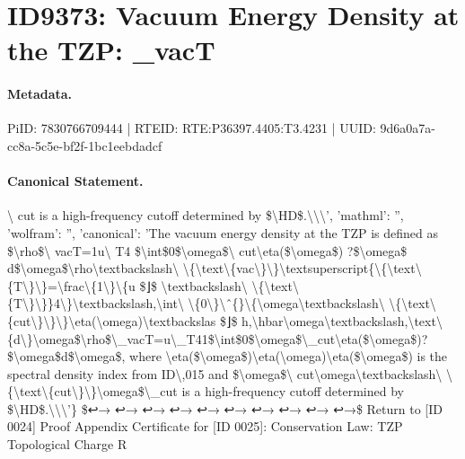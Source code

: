 \section*{ID9373: Vacuum Energy Density at the TZP: \_vacT}
\paragraph{Metadata.}
PiID: 7830766709444 | RTEID: RTE:P36397.4405:T3.4231 | UUID: 9d6a0a7a-cc8a-5c5e-bf2f-1bc1eebdadcf

\paragraph{Canonical Statement.}
\textbackslash{} cut is a high-frequency cutoff determined by \$\textbackslash{}HD\$.\textbackslash{}\textbackslash{}\textbackslash{}', 'mathml': '', 'wolfram': '', 'canonical': 'The vacuum energy density at the TZP is defined as \$\textbackslash{}rho\$\textbackslash{} vacT=1u\textbackslash{} T4 \$\textbackslash{}int\$0\$\textbackslash{}omega\$\textbackslash{} cut\textbackslash{}eta(\$\textbackslash{}omega\$) ?\$\textbackslash{}omega\$ d\$\textbackslash{}omega\$\textbackslash{}rho\textbackslash{}textbackslash\textbackslash{} \textbackslash{}\{\textbackslash{}text\textbackslash{}\{vac\textbackslash{}\}\textbackslash{}\}\textbackslash{}textsuperscript\{\textbackslash{}\{\textbackslash{}text\textbackslash{}\{T\textbackslash{}\}\textbackslash{}\}=\textbackslash{}frac\textbackslash{}\{1\textbackslash{}\}\textbackslash{}\{u \$⌋\$ \textbackslash{}textbackslash\textbackslash{} \textbackslash{}\{\textbackslash{}text\textbackslash{}\{T\textbackslash{}\}\textbackslash{}\}\}4\textbackslash{}\}\textbackslash{}textbackslash,\textbackslash{}int\textbackslash{} \textbackslash{}\{0\textbackslash{}\}\textbackslash{}ˆ\{\}\textbackslash{}\{\textbackslash{}omega\textbackslash{}textbackslash\textbackslash{} \textbackslash{}\{\textbackslash{}text\textbackslash{}\{cut\textbackslash{}\}\textbackslash{}\}\textbackslash{}\}\textbackslash{}eta(\textbackslash{}omega)\textbackslash{}textbackslas \$⌋\$ h,\textbackslash{}hbar\textbackslash{}omega\textbackslash{}textbackslash,\textbackslash{}text\textbackslash{}\{d\textbackslash{}\}\textbackslash{}omega\$\textbackslash{}rho\$\textbackslash{}\_vacT=u\textbackslash{}\_T41\$\textbackslash{}int\$0\$\textbackslash{}omega\$\textbackslash{}\_cut\textbackslash{}eta(\$\textbackslash{}omega\$)?\$\textbackslash{}omega\$d\$\textbackslash{}omega\$, where \textbackslash{}eta(\$\textbackslash{}omega\$)\textbackslash{}eta(\textbackslash{}omega)\textbackslash{}eta(\$\textbackslash{}omega\$) is the spectral density index from ID\textbackslash{},015 and \$\textbackslash{}omega\$\textbackslash{} cut\textbackslash{}omega\textbackslash{}textbackslash\textbackslash{} \textbackslash{}\{\textbackslash{}text\textbackslash{}\{cut\textbackslash{}\}\textbackslash{}\}\textbackslash{}omega\$\textbackslash{}\_cut is a high-frequency cutoff determined by \$\textbackslash{}HD\$.\textbackslash{}\textbackslash{}\textbackslash{}'\} \$↩→ ↩→ ↩→ ↩→ ↩→ ↩→ ↩→ ↩→ ↩→ ↩→\$ Return to [ID 0024] Proof Appendix Certificate for [ID 0025]: Conservation Law: TZP Topological Charge R

